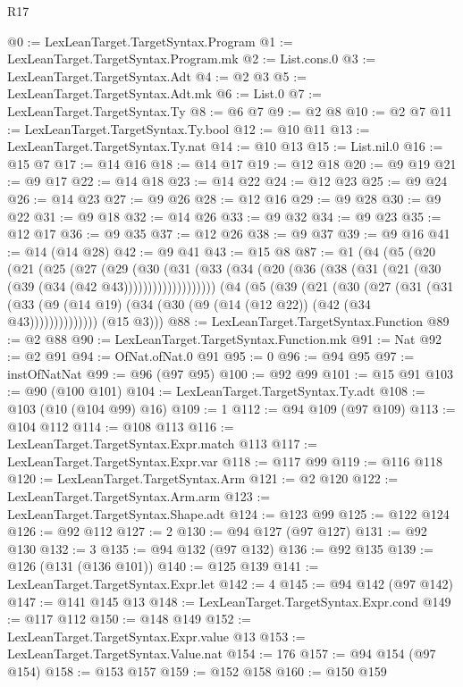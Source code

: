 \begin{lexlean}{R17}
\begin{coremodule}
@0 := LexLeanTarget.TargetSyntax.Program
@1 := LexLeanTarget.TargetSyntax.Program.mk
@2 := List.cons.{0}
@3 := LexLeanTarget.TargetSyntax.Adt
@4 := @2 @3
@5 := LexLeanTarget.TargetSyntax.Adt.mk
@6 := List.{0}
@7 := LexLeanTarget.TargetSyntax.Ty
@8 := @6 @7
@9 := @2 @8
@10 := @2 @7
@11 := LexLeanTarget.TargetSyntax.Ty.bool
@12 := @10 @11
@13 := LexLeanTarget.TargetSyntax.Ty.nat
@14 := @10 @13
@15 := List.nil.{0}
@16 := @15 @7
@17 := @14 @16
@18 := @14 @17
@19 := @12 @18
@20 := @9 @19
@21 := @9 @17
@22 := @14 @18
@23 := @14 @22
@24 := @12 @23
@25 := @9 @24
@26 := @14 @23
@27 := @9 @26
@28 := @12 @16
@29 := @9 @28
@30 := @9 @22
@31 := @9 @18
@32 := @14 @26
@33 := @9 @32
@34 := @9 @23
@35 := @12 @17
@36 := @9 @35
@37 := @12 @26
@38 := @9 @37
@39 := @9 @16
@41 := @14 (@14 @28)
@42 := @9 @41
@43 := @15 @8
@87 := @1
    (@4
      (@5
        (@20
          (@21
            (@25
              (@27
                (@29
                  (@30
                    (@31
                      (@33 (@34 (@20 (@36 (@38 (@31 (@21 (@30 (@39 (@34 (@42 @43)))))))))))))))))))
      (@4
        (@5
          (@39
            (@21
              (@30
                (@27
                  (@31
                    (@31
                      (@33 (@9 (@14 @19) (@34 (@30 (@9 (@14 (@12 @22)) (@42 (@34 @43))))))))))))))
        (@15 @3)))
@88 := LexLeanTarget.TargetSyntax.Function
@89 := @2 @88
@90 := LexLeanTarget.TargetSyntax.Function.mk
@91 := Nat
@92 := @2 @91
@94 := OfNat.ofNat.{0} @91
@95 := 0
@96 := @94 @95
@97 := instOfNatNat
@99 := @96 (@97 @95)
@100 := @92 @99
@101 := @15 @91
@103 := @90 (@100 @101)
@104 := LexLeanTarget.TargetSyntax.Ty.adt
@108 := @103 (@10 (@104 @99) @16)
@109 := 1
@112 := @94 @109 (@97 @109)
@113 := @104 @112
@114 := @108 @113
@116 := LexLeanTarget.TargetSyntax.Expr.match @113
@117 := LexLeanTarget.TargetSyntax.Expr.var
@118 := @117 @99
@119 := @116 @118
@120 := LexLeanTarget.TargetSyntax.Arm
@121 := @2 @120
@122 := LexLeanTarget.TargetSyntax.Arm.arm
@123 := LexLeanTarget.TargetSyntax.Shape.adt
@124 := @123 @99
@125 := @122 @124
@126 := @92 @112
@127 := 2
@130 := @94 @127 (@97 @127)
@131 := @92 @130
@132 := 3
@135 := @94 @132 (@97 @132)
@136 := @92 @135
@139 := @126 (@131 (@136 @101))
@140 := @125 @139
@141 := LexLeanTarget.TargetSyntax.Expr.let
@142 := 4
@145 := @94 @142 (@97 @142)
@147 := @141 @145 @13
@148 := LexLeanTarget.TargetSyntax.Expr.cond
@149 := @117 @112
@150 := @148 @149
@152 := LexLeanTarget.TargetSyntax.Expr.value @13
@153 := LexLeanTarget.TargetSyntax.Value.nat
@154 := 176
@157 := @94 @154 (@97 @154)
@158 := @153 @157
@159 := @152 @158
@160 := @150 @159

\end{coremodule}
\end{lexlean}
